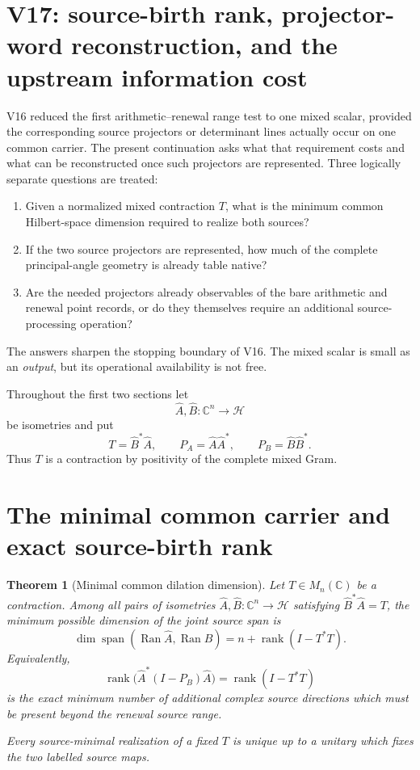 \documentclass[11pt]{article}
\newtheorem{theorem}{Theorem}[section]
\theoremstyle{definition}
\theoremstyle{remark}
\newcommand{\rank}{\operatorname{rank}}
\newcommand{\Span}{\operatorname{span}}
\begin{document}
\section{V17: source-birth rank, projector-word reconstruction, and the upstream information cost}
\label{sec:v17-context}

V16 reduced the first arithmetic--renewal range test to one mixed scalar,
provided the corresponding source projectors or determinant lines actually
occur on one common carrier.  The present continuation asks what that
requirement costs and what can be reconstructed once such projectors are
represented.  Three logically separate questions are treated:
\begin{enumerate}[label=\textup{(Q\arabic*)},leftmargin=3em]
\item Given a normalized mixed contraction $T$, what is the minimum common
      Hilbert-space dimension required to realize both sources?
\item If the two source projectors are represented, how much of the complete
      principal-angle geometry is already table native?
\item Are the needed projectors already observables of the bare arithmetic and
      renewal point records, or do they themselves require an additional
      source-processing operation?
\end{enumerate}
The answers sharpen the stopping boundary of V16.  The mixed scalar is small as
an \emph{output}, but its operational availability is not free.

Throughout the first two sections let
\[
 \widehat A,\widehat B:\mathbb C^n\longrightarrow\mathcal H
\]
be isometries and put
\[
 T=\widehat B^*\widehat A,
 \qquad
 P_A=\widehat A\widehat A^*,
 \qquad
 P_B=\widehat B\widehat B^*.
\]
Thus $T$ is a contraction by positivity of the complete mixed Gram.

\section{The minimal common carrier and exact source-birth rank}
\label{sec:v17-minimal-carrier}

\begin{theorem}[Minimal common dilation dimension]
\label{thm:v17-minimal-dilation}
Let $T\in M_n(\mathbb C)$ be a contraction.  Among all pairs of isometries
$\widehat A,\widehat B:\mathbb C^n\to\mathcal H$ satisfying
$\widehat B^*\widehat A=T$, the minimum possible dimension of the joint source
span is
\[
 \boxed{
 \dim\Span(\operatorname{Ran}\widehat A,\operatorname{Ran}\widehat B)
 =n+\rank(I-T^*T).}
 \tag{V17.1}\label{eq:v17-min-dim}
\]
Equivalently,
\[
 \boxed{
 \rank\bigl(\widehat A^*(I-P_B)\widehat A\bigr)
 =\rank(I-T^*T)}
 \tag{V17.2}\label{eq:v17-birth-rank}
\]
is the exact minimum number of additional complex source directions which must
be present beyond the renewal source range.

Every source-minimal realization of a fixed $T$ is unique up to a unitary which
fixes the two labelled source maps.
\end{theorem}
\end{document}
